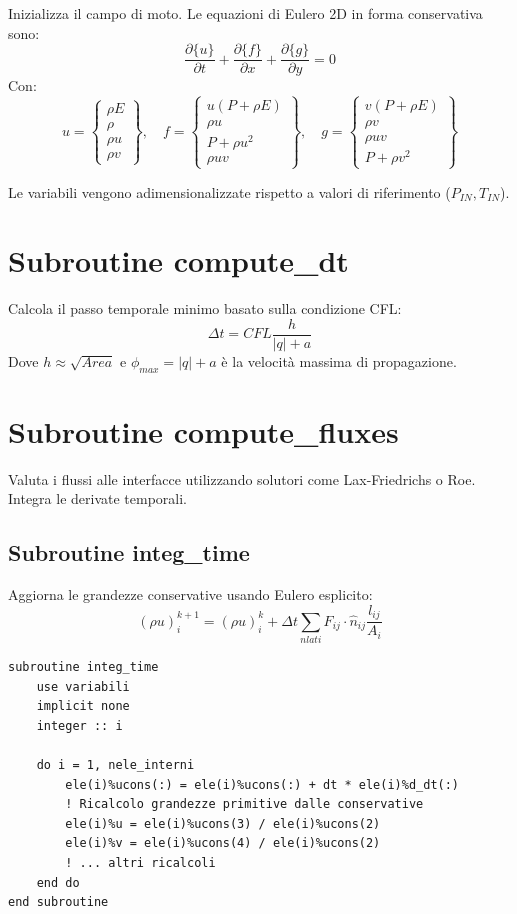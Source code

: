 Inizializza il campo di moto. Le equazioni di Eulero 2D in forma conservativa sono:
\[ \frac{\partial \{u\}}{\partial t} + \frac{\partial \{f\}}{\partial x} + \frac{\partial \{g\}}{\partial y} = 0 \]
Con:
\[ u = \begin{Bmatrix} \rho E \\ \rho \\ \rho u \\ \rho v \end{Bmatrix}, \quad f = \begin{Bmatrix} u(P+\rho E) \\ \rho u \\ P+\rho u^2 \\ \rho uv \end{Bmatrix}, \quad g = \begin{Bmatrix} v(P+\rho E) \\ \rho v \\ \rho uv \\ P+\rho v^2 \end{Bmatrix} \]

Le variabili vengono adimensionalizzate rispetto a valori di riferimento ($P_{IN}, T_{IN}$).

\section{Subroutine compute\_dt}

Calcola il passo temporale minimo basato sulla condizione CFL:
\[ \Delta t = CFL \frac{h}{|q| + a} \]
Dove $h \approx \sqrt{Area}$ e $\phi_{max} = |q| + a$ è la velocità massima di propagazione.

\section{Subroutine compute\_fluxes}

Valuta i flussi alle interfacce utilizzando solutori come Lax-Friedrichs o Roe. Integra le derivate temporali.

\subsection{Subroutine integ\_time}

Aggiorna le grandezze conservative usando Eulero esplicito:
\[ (\rho u)^{k+1}_i = (\rho u)^k_i + \Delta t \sum_{nlati} F_{ij} \cdot \hat{n}_{ij} \frac{l_{ij}}{A_i} \]

\begin{lstlisting}
subroutine integ_time
    use variabili
    implicit none
    integer :: i
    
    do i = 1, nele_interni
        ele(i)%ucons(:) = ele(i)%ucons(:) + dt * ele(i)%d_dt(:)
        ! Ricalcolo grandezze primitive dalle conservative
        ele(i)%u = ele(i)%ucons(3) / ele(i)%ucons(2)
        ele(i)%v = ele(i)%ucons(4) / ele(i)%ucons(2)
        ! ... altri ricalcoli
    end do
end subroutine
\end{lstlisting}
